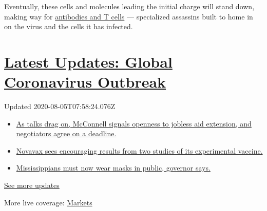 Eventually, these cells and molecules leading the initial charge will
stand down, making way for
\href{https://www.nytimes3xbfgragh.onion/2020/07/26/health/coronvirus-antibody-tests.html}{antibodies
and T cells} --- specialized assassins built to home in on the virus and
the cells it has infected.

\hypertarget{latest-updates-global-coronavirus-outbreak}{%
\section{\texorpdfstring{\href{https://www.nytimes3xbfgragh.onion/2020/08/04/world/coronavirus-cases.html?action=click\&pgtype=Article\&state=default\&region=MAIN_CONTENT_1\&context=storylines_live_updates}{Latest
Updates: Global Coronavirus
Outbreak}}{Latest Updates: Global Coronavirus Outbreak}}\label{latest-updates-global-coronavirus-outbreak}}

Updated 2020-08-05T07:58:24.076Z

\begin{itemize}
\tightlist
\item
  \href{https://www.nytimes3xbfgragh.onion/2020/08/04/world/coronavirus-cases.html?action=click\&pgtype=Article\&state=default\&region=MAIN_CONTENT_1\&context=storylines_live_updates\#link-762df92}{As
  talks drag on, McConnell signals openness to jobless aid extension,
  and negotiators agree on a deadline.}
\item
  \href{https://www.nytimes3xbfgragh.onion/2020/08/04/world/coronavirus-cases.html?action=click\&pgtype=Article\&state=default\&region=MAIN_CONTENT_1\&context=storylines_live_updates\#link-1228a480}{Novavax
  sees encouraging results from two studies of its experimental
  vaccine.}
\item
  \href{https://www.nytimes3xbfgragh.onion/2020/08/04/world/coronavirus-cases.html?action=click\&pgtype=Article\&state=default\&region=MAIN_CONTENT_1\&context=storylines_live_updates\#link-794484ed}{Mississippians
  must now wear masks in public, governor says.}
\end{itemize}

\href{https://www.nytimes3xbfgragh.onion/2020/08/04/world/coronavirus-cases.html?action=click\&pgtype=Article\&state=default\&region=MAIN_CONTENT_1\&context=storylines_live_updates}{See
more updates}

More live coverage:
\href{https://www.nytimes3xbfgragh.onion/live/2020/08/04/business/stock-market-today-coronavirus?action=click\&pgtype=Article\&state=default\&region=MAIN_CONTENT_1\&context=storylines_live_updates}{Markets}

